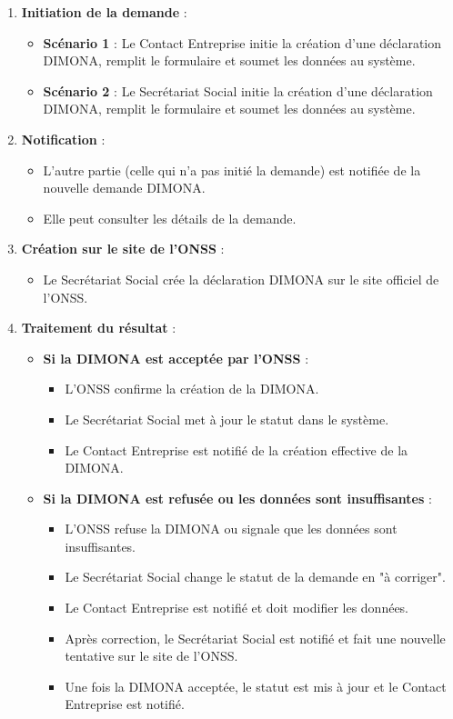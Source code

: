 \documentclass[12pt,a4paper]{report}
\begin{document}
\begin{enumerate}
  \item \textbf{Initiation de la demande} :
    \begin{itemize}
      \item \textbf{Scénario 1} : Le Contact Entreprise initie la création d'une déclaration DIMONA, remplit le formulaire et soumet les données au système.
      \item \textbf{Scénario 2} : Le Secrétariat Social initie la création d'une déclaration DIMONA, remplit le formulaire et soumet les données au système.
    \end{itemize}

  \item \textbf{Notification} :
    \begin{itemize}
      \item L'autre partie (celle qui n'a pas initié la demande) est notifiée de la nouvelle demande DIMONA.
      \item Elle peut consulter les détails de la demande.
    \end{itemize}

  \item \textbf{Création sur le site de l'ONSS} :
    \begin{itemize}
      \item Le Secrétariat Social crée la déclaration DIMONA sur le site officiel de l'ONSS.
    \end{itemize}

  \item \textbf{Traitement du résultat} :
    \begin{itemize}
      \item \textbf{Si la DIMONA est acceptée par l'ONSS} :
        \begin{itemize}
          \item L'ONSS confirme la création de la DIMONA.
          \item Le Secrétariat Social met à jour le statut dans le système.
          \item Le Contact Entreprise est notifié de la création effective de la DIMONA.
        \end{itemize}
      \item \textbf{Si la DIMONA est refusée ou les données sont insuffisantes} :
        \begin{itemize}
          \item L'ONSS refuse la DIMONA ou signale que les données sont insuffisantes.
          \item Le Secrétariat Social change le statut de la demande en "à corriger".
          \item Le Contact Entreprise est notifié et doit modifier les données.
          \item Après correction, le Secrétariat Social est notifié et fait une nouvelle tentative sur le site de l'ONSS.
          \item Une fois la DIMONA acceptée, le statut est mis à jour et le Contact Entreprise est notifié.
        \end{itemize}
    \end{itemize}
\end{enumerate}
\end{document}
